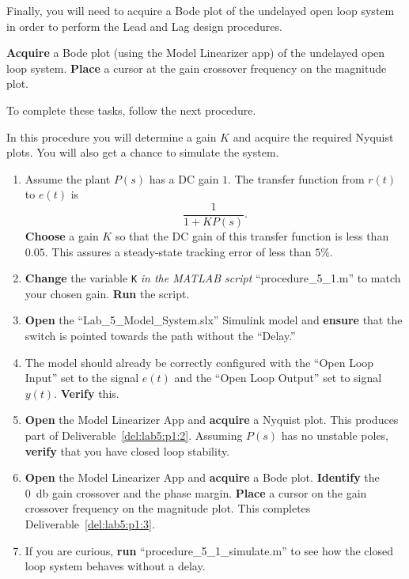 %
Finally, you will need to acquire a Bode plot of the undelayed open loop system in order to perform the Lead and Lag design procedures.
%
\begin{deliverable}[label={del:lab5:p1:3}]
  \textbf{Acquire} a Bode plot (using the Model Linearizer app) of the undelayed open loop system.
  \textbf{Place} a cursor at the gain crossover frequency on the magnitude plot.
\end{deliverable}
%
To complete these tasks, follow the next procedure.
%
\begin{procedure}[label={proc:lab5:1}]
  In this procedure you will determine a gain \(K\) and acquire the required Nyquist plots.
  You will also get a chance to simulate the system.
  \begin{enumerate}[label={(\arabic*)}]
    \item{%
      Assume the plant \(P(s)\) has a DC gain \(1.\)
      The transfer function from \(r(t)\) to \(e(t)\) is
      \[
        \frac{1}{1 + K P(s)}.
      \]
      \textbf{Choose} a gain \(K\) so that the DC gain of this transfer function is less than \(0.05.\)
      This assures a steady-state tracking error of less than \(5\%.\)
    }
    \item{%
      \textbf{Change} the variable \texttt{K} \emph{in the MATLAB script} ``procedure\_5\_1.m'' to match your chosen gain.
      \textbf{Run} the script.
    }
    \item{%
      \textbf{Open} the ``Lab\_5\_Model\_System.slx'' Simulink model and \textbf{ensure} that the switch is pointed towards the path without the ``Delay.''
    }
    \item{%
      The model should already be correctly configured with the ``Open Loop Input'' set to the signal \(e(t)\) and the ``Open Loop Output'' set to signal \(y(t).\)
      \textbf{Verify} this.
    }
    \item{%
      \textbf{Open} the Model Linearizer App and \textbf{acquire} a Nyquist plot.
      This produces part of Deliverable~\ref{del:lab5:p1:2}.
      Assuming \(P(s)\) has no unstable poles, \textbf{verify} that you have closed loop stability.
    }
    \item{%
      \textbf{Open} the Model Linearizer App and \textbf{acquire} a Bode plot.
      \textbf{Identify} the \SI{0}{\decibel} gain crossover and the phase margin.
      \textbf{Place} a cursor on the gain crossover frequency on the magnitude plot.
      This completes Deliverable~\ref{del:lab5:p1:3}.
    }
    \item{%
      If you are curious, \textbf{run} ``procedure\_5\_1\_simulate.m'' to see how the closed loop system behaves without a delay.
}
\end{enumerate}
\end{procedure}
